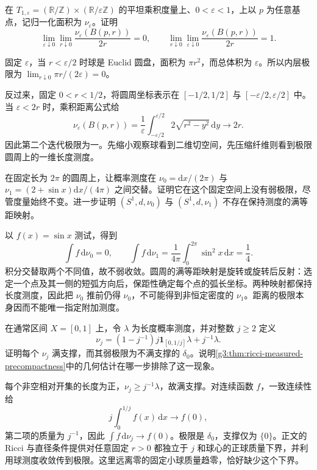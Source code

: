 \begin{exercise}\label{g3:ex:collapse-order-of-scales}
	在 \(T_{1,\varepsilon}=(\mathbb R/\mathbb Z)\times(\mathbb R/\varepsilon\mathbb Z)\) 的平坦乘积度量上、\(0<\varepsilon<1\)，上以 \(p\) 为任意基点，记归一化面积为 \(\nu_\varepsilon\)。证明
	\[
		\lim_{\varepsilon\downarrow0}\lim_{r\downarrow0}
		\frac{\nu_\varepsilon(B(p,r))}{2r}=0,
		\qquad
		\lim_{r\downarrow0}\lim_{\varepsilon\downarrow0}
		\frac{\nu_\varepsilon(B(p,r))}{2r}=1.
	\]
\end{exercise}
\begin{solution}
	固定 \(\varepsilon\)，当 \(r<\varepsilon/2\) 时球是 Euclid 圆盘，面积为 \(\pi r^2\)，而总体积为 \(\varepsilon\)。所以内层极限为 \(\lim_{r\downarrow0}\pi r/(2\varepsilon)=0\)。

	反过来，固定 \(0<r<1/2\)，将圆周坐标表示在 \([-1/2,1/2]\) 与 \([-\varepsilon/2,\varepsilon/2]\) 中。当 \(\varepsilon<2r\) 时，乘积距离公式给
	\[
		\nu_\varepsilon(B(p,r))
		=\frac1\varepsilon\int_{-\varepsilon/2}^{\varepsilon/2}
		2\sqrt{r^2-y^2}\,\mathrm dy\longrightarrow2r.
	\]
	因此第二个迭代极限为一。先缩小观察球看到二维切空间，先压缩纤维则看到极限圆周上的一维长度测度。
\end{solution}

\begin{exercise}\label{g3:ex:metric-limit-measure-choice}
	在固定长为 \(2\pi\) 的圆周上，让概率测度在 \(\nu_0=\mathrm dx/(2\pi)\) 与 \(\nu_1=(2+\sin x)\mathrm dx/(4\pi)\) 之间交替。证明它在这个固定空间上没有弱极限，尽管度量始终不变。进一步证明 \((S^1,d,\nu_0)\) 与 \((S^1,d,\nu_1)\) 不存在保持测度的满等距映射。
\end{exercise}
\begin{solution}
	以 \(f(x)=\sin x\) 测试，得到
	\[
		\int f\,\mathrm d\nu_0=0,\qquad
		\int f\,\mathrm d\nu_1=\frac1{4\pi}\int_0^{2\pi}\sin^2x\,\mathrm dx=\frac14.
	\]
	积分交替取两个不同值，故不弱收敛。圆周的满等距映射是旋转或旋转后反射：选定一个点及其一侧的短弧方向后，保距性确定每个点的弧长坐标。两种映射都保持长度测度，因此把 \(\nu_0\) 推前仍得 \(\nu_0\)，不可能得到非恒定密度的 \(\nu_1\)。距离的极限本身因而不能唯一指定附加测度。
\end{solution}

\begin{exercise}\label{g3:ex:full-support-limit}
	在通常区间 \(X=[0,1]\) 上，令 \(\lambda\) 为长度概率测度，并对整数 \(j\ge2\) 定义
	\[
		\nu_j=(1-j^{-1})j\mathbf1_{[0,1/j]}\lambda+j^{-1}\lambda.
	\]
	证明每个 \(\nu_j\) 满支撑，而其弱极限为不满支撑的 \(\delta_0\)。说明\cref{g3:thm:ricci-measured-precompactness}中的几何估计在哪一步排除了这一现象。
\end{exercise}
\begin{solution}
	每个非空相对开集的长度为正，\(\nu_j\ge j^{-1}\lambda\)，故满支撑。对连续函数 \(f\)，一致连续性给
	\[
		j\int_0^{1/j}f(x)\,\mathrm dx\longrightarrow f(0),
	\]
	第二项的质量为 \(j^{-1}\)，因此 \(\int f\,\mathrm d\nu_j\to f(0)\)。极限是 \(\delta_0\)，支撑仅为 \(\{0\}\)。正文的 Ricci 与直径条件提供对任意固定 \(r>0\) 都独立于 \(j\) 和球心的正球质量下界，并利用球测度收敛传到极限。这里远离零的固定小球质量趋零，恰好缺少这个下界。
\end{solution}

